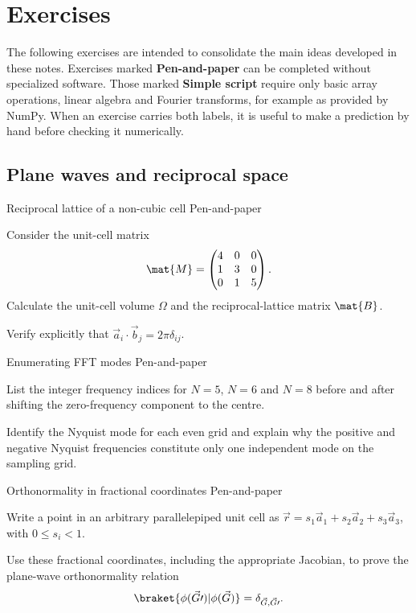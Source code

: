 %
%
%
\section{Exercises}
\label{chap:exercises}

The following exercises are intended to consolidate the main ideas developed in
these notes.  Exercises marked \textbf{Pen-and-paper} can be completed without
specialized software.  Those marked \textbf{Simple script} require only basic
array operations, linear algebra and Fourier transforms, for example as
provided by NumPy.  When an exercise carries both labels, it is useful to make
a prediction by hand before checking it numerically.

%
%
%
\subsection{Plane waves and reciprocal space}

\begin{exci}{Reciprocal lattice of a non-cubic cell \hfill\textnormal{\small Pen-and-paper}}
    \item Consider the unit-cell matrix
    \begin{equation*}
        \mat{M}=\begin{pmatrix}
            4&0&0\\
            1&3&0\\
            0&1&5
        \end{pmatrix}.
    \end{equation*}
    Calculate the unit-cell volume $\Omega$ and the reciprocal-lattice matrix
    $\mat{B}$.
    \item Verify explicitly that
    $\vec{a}_{i}\cdot\vec{b}_{j}=2\pi\delta_{ij}$.
\end{exci}

\begin{exci}{Enumerating FFT modes \hfill\textnormal{\small Pen-and-paper}}
    \item List the integer frequency indices for $N=5$, $N=6$ and $N=8$
    before and after shifting the zero-frequency component to the centre.
    \item Identify the Nyquist mode for each even grid and explain why the
    positive and negative Nyquist frequencies constitute only one independent
    mode on the sampling grid.
\end{exci}

\begin{exci}{Orthonormality in fractional coordinates \hfill\textnormal{\small Pen-and-paper}}
    \item Write a point in an arbitrary parallelepiped unit cell as
    $\vec{r}=s_{1}\vec{a}_{1}+s_{2}\vec{a}_{2}+s_{3}\vec{a}_{3}$, with
    $0\leq s_i<1$.
    \item Use these fractional coordinates, including the appropriate
    Jacobian, to prove the plane-wave orthonormality relation
    \begin{equation*}
        \braket{\phi(\vec{G}\prime)|\phi(\vec{G})}
        =\delta_{\vec{G},\vec{G}\prime}.
    \end{equation*}
\end{exci}

